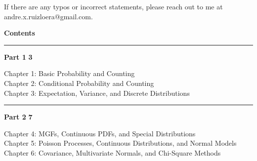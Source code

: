 \documentclass[11pt,letterpaper]{article}
\theoremstyle{remark}
\begin{document}
If there are any typos or incorrect statements, please reach out to me at andre.x.ruizloera@gmail.com.

\newpage

\thispagestyle{empty}
\vspace*{2cm}

\begin{center}
{\fontsize{32}{40}\selectfont \textbf{Contents}}
\end{center}

\vspace{2cm}

\noindent\rule{\textwidth}{1pt}

\vspace{0.8cm}

{\large \textbf{Part 1}} \dotfill \textbf{3}

\vspace{0.3cm}
\hspace{1.5cm} Chapter 1: Basic Probability and Counting  \\
\vspace{0.2cm}
\hspace{1.5cm} Chapter 2: Conditional Probability and Counting  \\
\vspace{0.2cm}
\hspace{1.5cm} Chapter 3: Expectation, Variance, and Discrete Distributions  \\

\vspace{0.8cm}
\noindent\rule{\textwidth}{0.5pt}
\vspace{0.8cm}

{\large \textbf{Part 2}} \dotfill \textbf{7}

\vspace{0.3cm}
\hspace{1.5cm} Chapter 4: MGFs, Continuous PDFs, and Special Distributions  \\
\vspace{0.2cm}
\hspace{1.5cm} Chapter 5: Poisson Processes, Continuous Distributions, and Normal Models  \\
\vspace{0.2cm}
\hspace{1.5cm} Chapter 6: Covariance, Multivariate Normals, and Chi-Square Methods  \\
\end{document}

